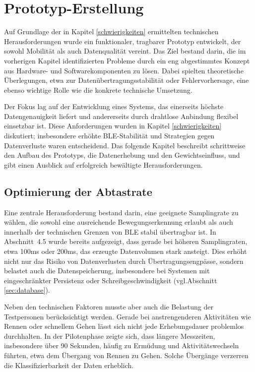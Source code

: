 \chapter{Prototyp-Erstellung}
\label{proto}
Auf Grundlage der in Kapitel \ref{schwierigkeiten} ermittelten technischen Herausforderungen wurde ein funktionaler, tragbarer Prototyp entwickelt, der sowohl Mobilität als auch Datenqualität vereint. Das Ziel bestand darin, die im vorherigen Kapitel identifizierten Probleme durch ein eng abgestimmtes Konzept aus Hardware- und Softwarekomponenten zu lösen. Dabei spielten theoretische Überlegungen, etwa zur Datenübertragungsstabilität oder Fehlervorhersage, eine ebenso wichtige Rolle wie die konkrete technische Umsetzung.

Der Fokus lag auf der Entwicklung eines Systems, das einerseits höchste Datengenauigkeit liefert und andererseits durch drahtlose Anbindung flexibel einsetzbar ist. Diese Anforderungen wurden in Kapitel \ref{schwierigkeiten} diskutiert; insbesondere erhöhte BLE-Stabilität und Strategien gegen Datenverluste waren entscheidend. Das folgende Kapitel beschreibt schrittweise den Aufbau des Prototyps, die Datenerhebung und den Gewichtseinfluss, und gibt einen Ausblick auf erfolgreich bewältigte Herausforderungen.

\section{Optimierung der Abtastrate}
\label{samplingrateAbs}
Eine zentrale Herausforderung bestand darin, eine geeignete Samplingrate zu wählen, die sowohl eine ausreichende Bewegungserkennung erlaubt als auch innerhalb der technischen Grenzen von BLE stabil übertragbar ist. In Abschnitt~4.5 wurde bereits aufgezeigt, dass gerade bei höheren Samplingraten, etwa 100ms oder 200ms, das erzeugte Datenvolumen stark ansteigt. Dies erhöht nicht nur das Risiko von Datenverlusten durch Übertragungsengpässe, sondern belastet auch die Datenspeicherung, insbesondere bei Systemen mit eingeschränkter Persistenz oder Schreibgeschwindigkeit (vgl.Abschnitt \ref{sec:database}).

Neben den technischen Faktoren musste aber auch die Belastung der Testpersonen berücksichtigt werden. Gerade bei anstrengenderen Aktivitäten wie Rennen oder schnellem Gehen lässt sich nicht jede Erhebungsdauer problemlos durchhalten. In der Pilotenphase zeigte sich, dass längere Messzeiten, insbesondere über 90 Sekunden, häufig zu Ermüdung und Aktivitätswechseln führten, etwa dem Übergang von Rennen zu Gehen. Solche Übergänge verzerren die Klassifizierbarkeit der Daten erheblich.

